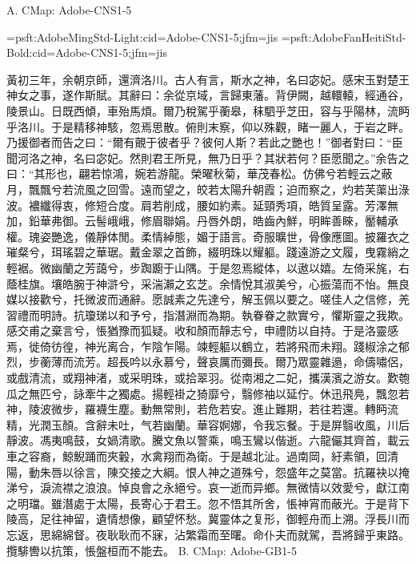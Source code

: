
\beginsection A. CMap: Adobe-CNS1-5

\jfont\testA={psft:AdobeMingStd-Light:cid=Adobe-CNS1-5;jfm=jis}
\jfont\testB={psft:AdobeFanHeitiStd-Bold:cid=Adobe-CNS1-5;jfm=jis}
\testB
{}\par
\smallskip
{}\par
\testA
\medskip
黃初三年，余朝京師，還濟洛川。古人有言，斯水之神，名曰宓妃。感宋玉對楚王神女之事，遂作斯賦。其辭曰：余從京域，言歸東藩。背伊闕，越轘轅，經通谷，陵景山。日既西傾，車殆馬煩。爾乃稅駕乎蘅皋，秣駟乎芝田，容与乎陽林，流眄乎洛川。于是精移神駭，忽焉思散。俯則末察，仰以殊觀，睹一麗人，于岩之畔。乃援御者而告之曰：“爾有覿于彼者乎？彼何人斯？若此之艷也！”御者對曰：“臣聞河洛之神，名曰宓妃。然則君王所見，無乃日乎？其狀若何？臣愿聞之。”余告之曰：“其形也，翩若惊鴻，婉若游龍。榮曜秋菊，華茂春松。仿佛兮若輕云之蔽月，飄飄兮若流風之回雪。遠而望之，皎若太陽升朝霞；迫而察之，灼若芙蕖出淥波。襛纖得衷，修短合度。肩若削成，腰如約素。延頸秀項，皓質呈露。芳澤無加，鉛華弗御。云髻峨峨，修眉聯娟。丹唇外朗，皓齒內鮮，明眸善睞，靨輔承權。瑰姿艷逸，儀靜体閒。柔情綽態，媚于語言。奇服曠世，骨像應圖。披羅衣之璀粲兮，珥瑤碧之華琚。戴金翠之首飾，綴明珠以耀軀。踐遠游之文履，曳霧綃之輕裾。微幽蘭之芳藹兮，步踟躕于山隅。于是忽焉縱体，以遨以嬉。左倚采旄，右蔭桂旗。壤皓腕于神滸兮，采湍瀨之玄芝。余情悅其淑美兮，心振蕩而不怡。無良媒以接歡兮，托微波而通辭。愿誠素之先達兮，解玉佩以要之。嗟佳人之信修，羌習禮而明詩。抗瓊珶以和予兮，指潛淵而為期。執眷眷之款實兮，懼斯靈之我欺。感交甫之棄言兮，悵猶豫而狐疑。收和顏而靜志兮，申禮防以自持。于是洛靈感焉，徙倚彷徨，神光离合，乍陰乍陽。竦輕軀以鶴立，若將飛而未翔。踐椒涂之郁烈，步蘅薄而流芳。超長吟以永慕兮，聲哀厲而彌長。爾乃眾靈雜遢，命儔嘯侶，或戲清流，或翔神渚，或采明珠，或拾翠羽。從南湘之二妃，攜漢濱之游女。歎匏瓜之無匹兮，詠牽牛之獨處。揚輕褂之猗靡兮，翳修袖以延佇。休迅飛鳧，飄忽若神，陵波微步，羅襪生塵。動無常則，若危若安。進止難期，若往若還。轉眄流精，光潤玉顏。含辭未吐，气若幽蘭。華容婀娜，令我忘餐。于是屏翳收風，川后靜波。馮夷鳴鼓，女媧清歌。騰文魚以警乘，鳴玉鸞以偕逝。六龍儼其齊首，載云車之容裔，鯨鯢踊而夾轂，水禽翔而為衛。于是越北沚。過南岡，紆素領，回清陽，動朱唇以徐言，陳交接之大綱。恨人神之道殊兮，怨盛年之莫當。抗羅袂以掩涕兮，淚流襟之浪浪。悼良會之永絕兮。哀一逝而异鄉。無微情以效愛兮，獻江南之明璫。雖潛處于太陽，長寄心于君王。忽不悟其所舍，悵神宵而蔽光。于是背下陵高，足往神留，遺情想像，顧望怀愁。冀靈体之复形，御輕舟而上溯。浮長川而忘返，思綿綿督。夜耿耿而不寐，沾繁霜而至曙。命仆夫而就駕，吾將歸乎東路。攬騑轡以抗策，悵盤桓而不能去。
\beginsection B. CMap: Adobe-GB1-5

